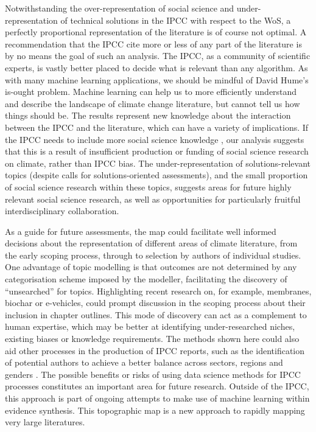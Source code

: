 \documentclass{article}
\begin{document}
\begin{linenumbers}
		

		Notwithstanding the over-representation of social science and under-representation of technical solutions in the IPCC with respect to the WoS, a
		 perfectly proportional representation of the literature is of course not optimal. A recommendation that the IPCC cite more or less of any part of the literature is by no means the goal of such an analysis. The IPCC, as a community of scientific experts, is vastly better placed to decide what is relevant than any algorithm. 
		As with many machine learning applications, we should be mindful of David Hume's is-ought problem. 
		Machine learning can help us to more efficiently understand and describe the landscape of climate change literature, but cannot tell us how things should be. 
		The results represent new knowledge about the interaction between the IPCC and the literature, which can have a variety of implications. 
		If the IPCC needs to include more social science knowledge \cite{Victor2015}, our analysis suggests that this is a result of insufficient production or funding of social science research on climate, rather than IPCC bias. 
		The under-representation of solutions-relevant topics (despite calls for solutions-oriented assessments), and the small proportion of social science research within these topics,  suggests areas for future highly relevant social science research, as well as opportunities for particularly fruitful interdisciplinary collaboration. 
		
		
		As a guide for future assessments, the map could facilitate well informed decisions about the representation of different areas of climate literature, from the early scoping process, through to selection by authors of individual studies.
		One advantage of topic modelling is that outcomes are not determined by any categorisation scheme imposed by the modeller, facilitating the discovery of ``unsearched'' for topics. 
		Highlighting recent research on, for example, membranes, biochar or e-vehicles, could prompt discussion in the scoping process about their inclusion in chapter outlines.
		This mode of discovery can act as a complement to human expertise, which may be better at identifying under-researched niches, existing biases or knowledge requirements.
		The methods shown here could also aid other processes in the production of IPCC reports, such as the identification of potential authors to achieve a better balance across sectors, regions and genders \cite{Corbera2016}. The possible benefits or risks of using data science methods for IPCC processes constitutes an important area for future research.
		Outside of the IPCC, this approach is part of ongoing attempts to make use of machine learning within evidence synthesis. This topographic map is a new approach to rapidly mapping very large literatures. 
		

\end{linenumbers}
\end{document}

